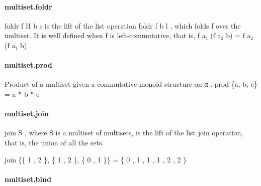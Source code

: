 \documentclass{article}
\begin{document}
\paragraph{multiset.foldr}
\par
\colorbox[RGB]{253,246,227}{{{{\color[RGB]{101, 123, 131} foldr f H b s }}}} is the lift of the list operation 
\colorbox[RGB]{253,246,227}{{{{\color[RGB]{101, 123, 131} foldr f b l }}}},
which folds 
\colorbox[RGB]{253,246,227}{{{{\color[RGB]{101, 123, 131} f }}}} over the multiset. It is well defined when 
\colorbox[RGB]{253,246,227}{{{{\color[RGB]{101, 123, 131} f }}}} is left-commutative,
that is, 
\colorbox[RGB]{253,246,227}{{{{\color[RGB]{101, 123, 131} f a₁ (f a₂ b)  }}}{{{\color[RGB]{181, 137, 0} = }}}{{{\color[RGB]{101, 123, 131}  f a₂ (f a₁ b) }}}}.
\paragraph{multiset.prod}
\par
Product of a multiset given a commutative monoid structure on 
\colorbox[RGB]{253,246,227}{{{{\color[RGB]{101, 123, 131} α }}}}.
\colorbox[RGB]{253,246,227}{{{{\color[RGB]{101, 123, 131} prod \{a, b, c\}  }}}{{{\color[RGB]{181, 137, 0} = }}}{{{\color[RGB]{101, 123, 131}  a  }}}{{{\color[RGB]{181, 137, 0} * }}}{{{\color[RGB]{101, 123, 131}  b  }}}{{{\color[RGB]{181, 137, 0} * }}}{{{\color[RGB]{101, 123, 131}  c }}}}\paragraph{multiset.join}
\par
\colorbox[RGB]{253,246,227}{{{{\color[RGB]{101, 123, 131} join S }}}}, where 
\colorbox[RGB]{253,246,227}{{{{\color[RGB]{101, 123, 131} S }}}} is a multiset of multisets, is the lift of the list join
operation, that is, the union of all the sets.
\\
\colorbox[RGB]{253,246,227}{\parbox{4.5in}{{{{\color[RGB]{101, 123, 131} join \{\{ }}}{{{\color[RGB]{108, 113, 196} 1 }}}{{{\color[RGB]{101, 123, 131} ,  }}}{{{\color[RGB]{108, 113, 196} 2 }}}{{{\color[RGB]{101, 123, 131} \}, \{ }}}{{{\color[RGB]{108, 113, 196} 1 }}}{{{\color[RGB]{101, 123, 131} ,  }}}{{{\color[RGB]{108, 113, 196} 2 }}}{{{\color[RGB]{101, 123, 131} \}, \{ }}}{{{\color[RGB]{108, 113, 196} 0 }}}{{{\color[RGB]{101, 123, 131} ,  }}}{{{\color[RGB]{108, 113, 196} 1 }}}{{{\color[RGB]{101, 123, 131} \}\}  }}}{{{\color[RGB]{181, 137, 0} = }}}{{{\color[RGB]{101, 123, 131}  \{ }}}{{{\color[RGB]{108, 113, 196} 0 }}}{{{\color[RGB]{101, 123, 131} ,  }}}{{{\color[RGB]{108, 113, 196} 1 }}}{{{\color[RGB]{101, 123, 131} ,  }}}{{{\color[RGB]{108, 113, 196} 1 }}}{{{\color[RGB]{101, 123, 131} ,  }}}{{{\color[RGB]{108, 113, 196} 1 }}}{{{\color[RGB]{101, 123, 131} ,  }}}{{{\color[RGB]{108, 113, 196} 2 }}}{{{\color[RGB]{101, 123, 131} ,  }}}{{{\color[RGB]{108, 113, 196} 2 }}}{{{\color[RGB]{101, 123, 131} \} }}}\\

}}\paragraph{multiset.bind}
\end{document}
